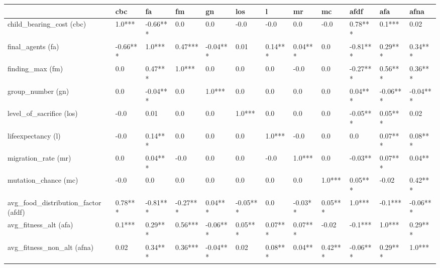 \begin{tabular}{llllllllllll}
\toprule
{} &       cbc &        fa &        fm &        gn &       los &        l &       mr &       mc &      afdf &       afa &      afna  \\
\midrule
child\_bearing\_cost (cbc)            &    1.0*** &  -0.66*** &       0.0 &       0.0 &      -0.0 &     -0.0 &      0.0 &     -0.0 &   0.78*** &    0.1*** &      0.02  \\
final\_agents (fa)                   &  -0.66*** &    1.0*** &   0.47*** &  -0.04*** &      0.01 &  0.14*** &  0.04*** &      0.0 &  -0.81*** &   0.29*** &   0.34***  \\
finding\_max (fm)                    &       0.0 &   0.47*** &    1.0*** &       0.0 &       0.0 &      0.0 &     -0.0 &      0.0 &  -0.27*** &   0.56*** &   0.36***  \\
group\_number (gn)                   &       0.0 &  -0.04*** &       0.0 &    1.0*** &       0.0 &      0.0 &      0.0 &      0.0 &   0.04*** &  -0.06*** &  -0.04***  \\
level\_of\_sacrifice (los)            &      -0.0 &      0.01 &       0.0 &       0.0 &    1.0*** &      0.0 &      0.0 &      0.0 &  -0.05*** &   0.05*** &      0.02  \\
lifeexpectancy (l)                  &      -0.0 &   0.14*** &       0.0 &       0.0 &       0.0 &   1.0*** &     -0.0 &      0.0 &       0.0 &   0.07*** &   0.08***  \\
migration\_rate (mr)                 &       0.0 &   0.04*** &      -0.0 &       0.0 &       0.0 &     -0.0 &   1.0*** &      0.0 &   -0.03** &   0.07*** &    0.04**  \\
mutation\_chance (mc)                &      -0.0 &       0.0 &       0.0 &       0.0 &       0.0 &      0.0 &      0.0 &   1.0*** &   0.05*** &     -0.02 &   0.42***  \\
avg\_food\_distribution\_factor (afdf) &   0.78*** &  -0.81*** &  -0.27*** &   0.04*** &  -0.05*** &      0.0 &  -0.03** &  0.05*** &    1.0*** &   -0.1*** &  -0.06***  \\
avg\_fitness\_alt (afa)               &    0.1*** &   0.29*** &   0.56*** &  -0.06*** &   0.05*** &  0.07*** &  0.07*** &    -0.02 &   -0.1*** &    1.0*** &   0.29***  \\
avg\_fitness\_non\_alt (afna)          &      0.02 &   0.34*** &   0.36*** &  -0.04*** &      0.02 &  0.08*** &   0.04** &  0.42*** &  -0.06*** &   0.29*** &    1.0***  \\
\bottomrule
\end{tabular}
